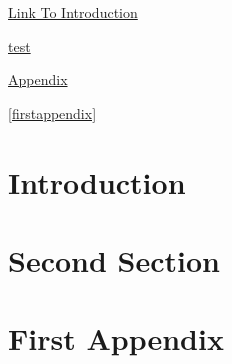 \documentclass{article}
\begin{document}
	
	\hyperlink{section.1}{Link To Introduction} 
	
	\hyperref[secondsection]{test}
	
	\hyperref[firstappendix]{Appendix}
	
	\autoref{firstappendix} 
	
	\clearpage
	\section{Introduction} 
	\clearpage
	\section{Second Section}\label{secondsection}
	\clearpage
	\appendix
	\section{First Appendix}\label{firstappendix}
	
\end{document}
